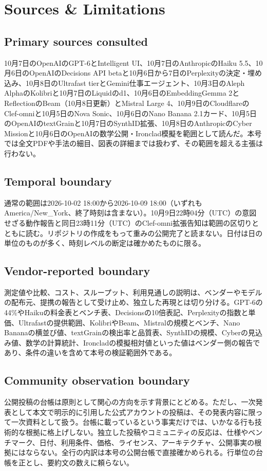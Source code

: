 \section*{Sources \& Limitations}

\subsection*{Primary sources consulted}
10月7日のOpenAIのGPT-6とIntelligent UI、10月7日のAnthropicのHaiku 5.5、10月6日のOpenAIのDecisions API betaと10月6日から7日のPerplexityの決定・埋め込み、10月8日のUltrafast tierとGemini仕事エージェント、10月3日のAleph AlphaのKolibriと10月7日のLiquidのd1、10月6日のEmbeddingGemma 2とReflectionのBeam（10月8日更新）とMistral Large 4、10月9日のCloudflareのClef-omniと10月5日のNova Sonic、10月6日のNano Banana 2.1カード、10月5日のOpenAIのtextGrainと10月7日のSynthID拡張、10月8日のAnthropicのCyber Missionと10月6日のOpenAIの数学公開・Ironclad模擬を範囲として読んだ。本号では全文PDFや手法の細目、図表の詳細までは扱わず、その範囲を超える主張は行わない。

\subsection*{Temporal boundary}
通常の範囲は2026-10-02 18:00から2026-10-09 18:00（いずれもAmerica/New\_York、終了時刻は含まない）。10月9日22時04分（UTC）の意図せざる動作報告と同日23時11分（UTC）のClef-omni拡張告知は範囲の区切りとともに読む。リポジトリの作成をもって重みの公開完了と読まない。日付は日の単位のものが多く、時刻レベルの断定は確かめたものに限る。

\subsection*{Vendor-reported boundary}
測定値や比較、コスト、スループット、利用見通しの説明は、ベンダーやモデルの配布元、提携の報告として受け止め、独立した再現とは切り分ける。GPT-6の44\%やHaikuの料金表とベンチ表、Decisionsの10倍表記、Perplexityの指数と単価、Ultrafastの提供範囲、KolibriやBeam、Mistralの規模とベンチ、Nano Bananaの横並び値、textGrainの検出率と品質表、SynthIDの規模、Cyberの見込み値、数学の計算統計、Ironcladの模擬相対値といった値はベンダー側の報告であり、条件の違いを含めて本号の検証範囲外である。

\subsection*{Community observation boundary}
公開投稿の台帳は原則として関心の方向を示す背景にとどめる。ただし、一次発表として本文で明示的に引用した公式アカウントの投稿は、その発表内容に限って一次資料として扱う。台帳に載っているという事実だけでは、いかなる行も技術的な根拠に格上げしない。独立した投稿やコミュニティの反応は、仕様やベンチマーク、日付、利用条件、価格、ライセンス、アーキテクチャ、公開事実の根拠にはならない。全行の内訳は本号の公開台帳で直接確かめられる。行単位の台帳を正とし、要約文の数えに頼らない。

